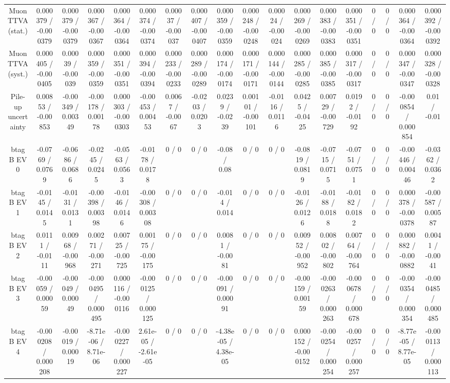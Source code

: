 \documentclass[10pt]{article}
\begin{document}
\begin{table}[htbp]
\begin{center}
\begin{tabular}{|c|c|c|c|c|c|c|c|c|c|c|c|c|c|c|c|c|c|}
  Muon TTVA (stat.) & 0.000379 / -0.000379 & 0.000379 / -0.000379 & 0.000367 / -0.000367 & 0.000364 / -0.000364 & 0.000374 / -0.000374 & 0.00037 / -0.00037 & 0.000407 / -0.000407 & 0.000359 / -0.000359 & 0.000248 / -0.000248 & 0.00024 / -0.00024 & 0.000269 / -0.000269 & 0.000383 / -0.000383 & 0.000351 / -0.000351 & 0 / 0 & 0 / 0 & 0.000364 / -0.000364 & 0.000392 / -0.000392 \\ 
  Muon TTVA (syst.) & 0.000405 / -0.000405 & 0.00039 / -0.00039 & 0.000359 / -0.000359 & 0.000351 / -0.000351 & 0.000394 / -0.000394 & 0.000233 / -0.000233 & 0.000289 / -0.000289 & 0.000174 / -0.000174 & 0.000171 / -0.000171 & 0.000144 / -0.000144 & 0.000285 / -0.000285 & 0.000385 / -0.000385 & 0.000317 / -0.000317 & 0 / 0 & 0 / 0 & 0.000347 / -0.000347 & 0.000328 / -0.000328 \\ 
  Pile-up uncertainty & 0.00853 / -0.00853 & -0.00349 / 0.00349 & -0.00178 / 0.00178 & 0.000303 / -0.000303 & -0.00453 / 0.00453 & 0.0067 / -0.0067 & -0.0203 / 0.0203 & 0.0239 / -0.0239 & 0.00101 / -0.00101 & -0.0116 / 0.0116 & 0.0425 / -0.0425 & 0.00729 / -0.00729 & 0.0192 / -0.0192 & 0 / 0 & 0 / 0 & -0.000854 / 0.000854 & 0.01 / -0.01 \\ 
  btag B EV 0 & -0.0769 / 0.0769 & -0.0686 / 0.0686 & -0.0245 / 0.0245 & -0.0563 / 0.0563 & -0.0178 / 0.0178 & 0 / 0 & 0 / 0 & -0.08 / 0.08 & 0 / 0 & 0 / 0 & -0.0819 / 0.0819 & -0.0715 / 0.0715 & -0.0751 / 0.0751 & 0 / 0 & 0 / 0 & -0.00446 / 0.00446 & -0.0362 / 0.0362 \\ 
  btag B EV 1 & -0.0145 / 0.0145 & -0.0131 / 0.0131 & -0.00398 / 0.00398 & -0.0146 / 0.0146 & -0.00308 / 0.00308 & 0 / 0 & 0 / 0 & -0.014 / 0.014 & 0 / 0 & 0 / 0 & -0.0126 / 0.0126 & -0.0188 / 0.0188 & -0.0182 / 0.0182 & 0 / 0 & 0 / 0 & 0.000378 / -0.000378 & -0.00587 / 0.00587 \\ 
  btag B EV 2 & 0.0111 / -0.0111 & 0.00968 / -0.00968 & 0.00271 / -0.00271 & 0.00725 / -0.00725 & 0.00175 / -0.00175 & 0 / 0 & 0 / 0 & 0.0081 / -0.0081 & 0 / 0 & 0 / 0 & 0.00952 / -0.00952 & 0.00802 / -0.00802 & 0.00764 / -0.00764 & 0 / 0 & 0 / 0 & 0.000882 / -0.000882 & 0.0041 / -0.0041 \\ 
  btag B EV 3 & -0.00059 / 0.00059 & -0.00049 / 0.00049 & -0.000495 / 0.000495 & 0.000116 / -0.000116 & -0.000125 / 0.000125 & 0 / 0 & 0 / 0 & -0.00091 / 0.00091 & 0 / 0 & 0 / 0 & -0.00159 / 0.00159 & -0.000263 / 0.000263 & -0.000678 / 0.000678 & 0 / 0 & 0 / 0 & -0.000354 / 0.000354 & -0.000485 / 0.000485 \\ 
  btag B EV 4 & -0.000208 / 0.000208 & -0.00019 / 0.00019 & -8.71e-06 / 8.71e-06 & -0.000227 / 0.000227 & 2.61e-05 / -2.61e-05 & 0 / 0 & 0 / 0 & -4.38e-05 / 4.38e-05 & 0 / 0 & 0 / 0 & 0.000152 / -0.000152 & -0.000254 / 0.000254 & -0.000257 / 0.000257 & 0 / 0 & 0 / 0 & -8.77e-05 / 8.77e-05 & -0.000113 / 0.000113 \\ 

\end{tabular}
\end{center}
\end{table}
\end{document}
